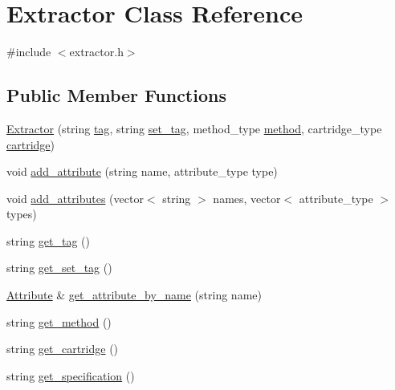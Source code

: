 \hypertarget{classExtractor}{}\section{Extractor Class Reference}
\label{classExtractor}


{\ttfamily \#include $<$extractor.\+h$>$}

\subsection*{Public Member Functions}
\begin{DoxyCompactItemize}
\item 
\hyperlink{classExtractor_ab1bbe102a4f6087831d6090bb7096c09}{Extractor} (string \hyperlink{classExtractor_a53f998b8d2fb1032f6c86f0d04a2ffc8}{tag}, string \hyperlink{classExtractor_acafbe087b3bae5259d6e6c7bb7999255}{set\+\_\+tag}, method\+\_\+type \hyperlink{classExtractor_a9167bf123b2164a89175253d64bdab43}{method}, cartridge\+\_\+type \hyperlink{classExtractor_a19cea477abf042cec1ad70cb56bbd973}{cartridge})
\item 
void \hyperlink{classExtractor_ae82579657e380e26facb22dbf2c52966}{add\+\_\+attribute} (string name, attribute\+\_\+type type)
\item 
void \hyperlink{classExtractor_a429e9f3ad4cfeb712b01c2617f2253e6}{add\+\_\+attributes} (vector$<$ string $>$ names, vector$<$ attribute\+\_\+type $>$ types)
\item 
string \hyperlink{classExtractor_ad23a148dddb5a78557b84baa00829fc4}{get\+\_\+tag} ()
\item 
string \hyperlink{classExtractor_a133d1cd6a2749254614d7cebd9832cea}{get\+\_\+set\+\_\+tag} ()
\item 
\hyperlink{classAttribute}{Attribute} \& \hyperlink{classExtractor_a56a4af532b92d7dbe7aa6f9db242e992}{get\+\_\+attribute\+\_\+by\+\_\+name} (string name)
\item 
string \hyperlink{classExtractor_ae76e664785cb63537295ce404e728191}{get\+\_\+method} ()
\item 
string \hyperlink{classExtractor_a44ed7358715318d58dc5246ab43fcd2b}{get\+\_\+cartridge} ()
\item 
string \hyperlink{classExtractor_ad2576ada89be5c806e8f0cbc319e8f19}{get\+\_\+specification} ()
\end{DoxyCompactItemize}
